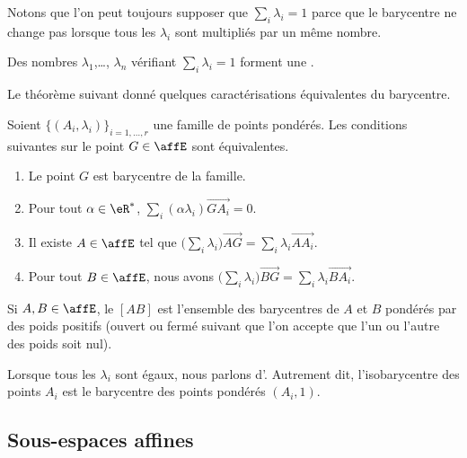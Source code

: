 Notons que l'on peut toujours supposer que \( \sum_i\lambda_i=1\) parce que le barycentre ne change pas lorsque tous les \( \lambda_i\) sont multipliés par un même nombre.
\begin{definition}\label{DefIMZooLFdIUB}
    Des nombres \( \lambda_1\),\ldots, \( \lambda_n\) vérifiant \( \sum_i\lambda_i=1\) forment une .
\end{definition}

Le théorème suivant donné quelques caractérisations équivalentes du barycentre.
\begin{theorem}      \label{ThoIJVzxr}
    Soient \( \{ (A_i,\lambda_i) \}_{i=1,\ldots, r}\) une famille de points pondérés. Les conditions suivantes sur le point \( G\in \affE\) sont équivalentes.
    \begin{enumerate}
        \item
            Le point \( G\) est barycentre de la famille.
        \item
            Pour tout \( \alpha\in \eR^*\), \( \sum_i(\alpha\lambda_i)\overrightarrow{ GA_i }=0\).
        \item
            Il existe \( A\in\affE\) tel que \( \big( \sum_i\lambda_i \big)\overrightarrow{ AG }=\sum_i\lambda_i\overrightarrow{ AA_i }\).
        \item   \label{ItemEgOQBX}
            Pour tout \( B\in\affE\), nous avons \( \big( \sum_i\lambda_i \big)\overrightarrow{ BG }=\sum_i\lambda_i\overrightarrow{ BA_i }\).
    \end{enumerate}
\end{theorem}

\begin{definition}
    Si \( A,B\in \affE\), le  \( [AB]\) est l'ensemble des barycentres de \( A\) et \( B\) pondérés par des poids positifs (ouvert ou fermé suivant que l'on accepte que l'un ou l'autre des poids soit nul).
\end{definition}

Lorsque tous les \( \lambda_i\) sont égaux, nous parlons d'. Autrement dit, l'isobarycentre des points \( A_i\) est le barycentre des points pondérés \( (A_i,1)\).

\subsection{Sous-espaces affines}

